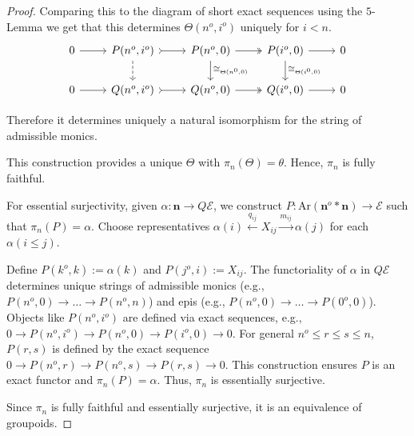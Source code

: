 \documentclass[12pt]{report}
\numberwithin{equation}{section}
\begin{document}
\begin{proof}
			
			Comparing this to the diagram of short exact sequences using the \( 5\)-Lemma we get that this determines \( \Theta(n^o,i^o) \) uniquely for \( i <n \).
			\[\begin{tikzcd}
				0 & {P(n^o,i^o)} & {P(n^o,0)} & {P(i^o,0)} & 0 \\
				0 & {Q(n^o,i^o)} & {Q(n^o,0)} & {Q(i^o,0)} & 0
				\arrow[from=1-1, to=1-2]
				\arrow[tail, from=1-2, to=1-3]
				\arrow[dashed, from=1-2, to=2-2]
				\arrow[two heads, from=1-3, to=1-4]
				\arrow["{\cong_{\Theta(n^0,0)}}", from=1-3, to=2-3]
				\arrow[from=1-4, to=1-5]
				\arrow["{\cong_{\Theta(i^0,0)}}", from=1-4, to=2-4]
				\arrow[from=2-1, to=2-2]
				\arrow[tail, from=2-2, to=2-3]
				\arrow[two heads, from=2-3, to=2-4]
				\arrow[from=2-4, to=2-5]
			\end{tikzcd}\]
			
			Therefore it determines uniquely a natural isomorphism for the string of admissible monics.
			
			
			This construction provides a unique $\Theta$ with $\pi_n(\Theta)=\theta$. Hence, $\pi_n$ is fully faithful.
			
			
			For essential surjectivity, given $\alpha: \mathbf{n} \to Q\mathcal{E}$, we construct $P: \mathrm{Ar}(\mathbf{n}^o * \mathbf{n}) \to \mathcal{E}$ such that $\pi_n(P) = \alpha$. Choose representatives $\alpha(i) \xleftarrow{q_{ij}} X_{ij} \xrightarrow{m_{ij}} \alpha(j)$ for each $\alpha(i \le j)$.
			
			Define $P(k^o, k) := \alpha(k)$ and $P(j^o, i) := X_{ij}$. The functoriality of $\alpha$ in $Q\mathcal{E}$ determines unique strings of admissible monics (e.g., $P(n^o,0) \to \dots \to P(n^o,n)$) and epis (e.g., $P(n^o,0) \to \dots \to P(0^o,0)$). Objects like $P(n^o, i^o)$ are defined via exact sequences, e.g., $0 \to P(n^o,i^o) \to P(n^o,0) \to P(i^o,0) \to 0$. For general $n^o \le r \le s \le n$, $P(r,s)$ is defined by the exact sequence $0 \to P(n^o,r) \to P(n^o,s) \to P(r,s) \to 0$. This construction ensures $P$ is an exact functor and $\pi_n(P)=\alpha$. Thus, $\pi_n$ is essentially surjective.
			
			Since $\pi_n$ is fully faithful and essentially surjective, it is an equivalence of groupoids.
			
	\end{proof}
	
\end{document}
